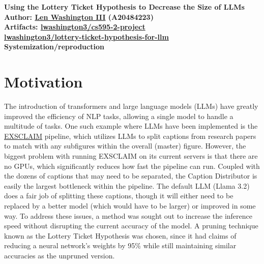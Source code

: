 \documentclass[
	title={Lottery Ticket Hypothesis for Large Language Models}
]{cs595project}
\begin{document}
%
\begin{center}
	{\bfseries\Huge Using the Lottery Ticket Hypothesis to Decrease the Size of LLMs}\\
	{\bfseries \Large Author: \href{mailto:lwashington3@hawk.illinoistech.edu}{Len Washington III} (A20484223)}\\
	{\bfseries \Large Artifacts: \href{https://github.com/lwashington3/cs595-2-project}{ lwashington3/cs595-2-project}\\ \href{https://huggingface.co/collections/lwashington3/lottery-ticket-hypothesis-for-llm}{ lwashington3/lottery-ticket-hypothesis-for-llm}}\\
	\textbf{Systemization/reproduction}
\end{center}

\section{Motivation}\label{sec:motivation} %
The introduction of transformers and large language models (LLMs) have greatly improved the efficiency of NLP tasks, allowing a single model to handle a multitude of tasks.
One such example where LLMs have been implemented is the \href{https://exsclaim.materialeyes.org}{EXSCLAIM} pipeline,\supercite{EXSCLAIM} which utilizes LLMs to split captions from research papers to match with any subfigures within the overall (master) figure.
However, the biggest problem with running EXSCLAIM on its current servers is that there are no GPUs, which significantly reduces how fast the pipeline can run.
Coupled with the dozens of captions that may need to be separated, the Caption Distributor is easily the largest bottleneck within the pipeline.
The default LLM (Llama 3.2) does a fair job of splitting these captions, though it will either need to be replaced by a better model (which would have to be larger) or improved in some way.
To address these issues, a method was sought out to increase the inference speed without disrupting the current accuracy of the model.
A pruning technique known as the Lottery Ticket Hypothesis was chosen, since it had claims of reducing a neural network's weights by 95\% while still maintaining similar accuracies as the unpruned version.
\end{document}
